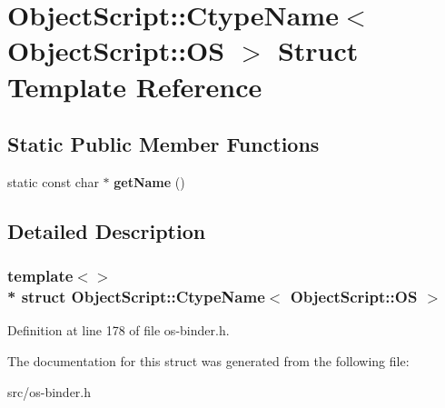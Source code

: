 \hypertarget{struct_object_script_1_1_ctype_name_3_01_object_script_1_1_o_s_01_4}{}\section{Object\+Script\+:\+:Ctype\+Name$<$ Object\+Script\+:\+:OS $>$ Struct Template Reference}
\label{struct_object_script_1_1_ctype_name_3_01_object_script_1_1_o_s_01_4}
\subsection*{Static Public Member Functions}
\begin{DoxyCompactItemize}
\item 
static const char $\ast$ {\bfseries get\+Name} ()\hypertarget{struct_object_script_1_1_ctype_name_3_01_object_script_1_1_o_s_01_4_a00cf1a19fae36348b166be7326fa3d79}{}\label{struct_object_script_1_1_ctype_name_3_01_object_script_1_1_o_s_01_4_a00cf1a19fae36348b166be7326fa3d79}

\end{DoxyCompactItemize}


\subsection{Detailed Description}
\subsubsection*{template$<$$>$\\*
struct Object\+Script\+::\+Ctype\+Name$<$ Object\+Script\+::\+O\+S $>$}



Definition at line 178 of file os-\/binder.\+h.



The documentation for this struct was generated from the following file\+:\begin{DoxyCompactItemize}
\item 
src/os-\/binder.\+h\end{DoxyCompactItemize}
